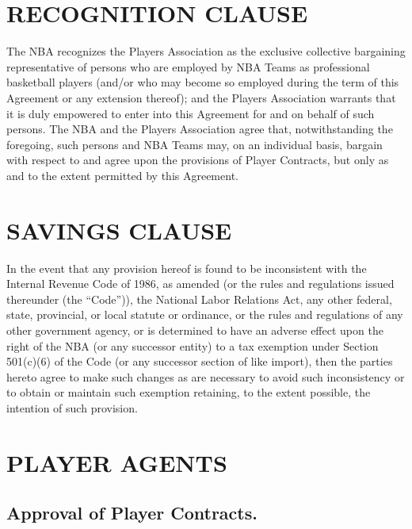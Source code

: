 \documentclass[
]{book}
\begin{document}
\hypertarget{recognition-clause}{%
\chapter{RECOGNITION CLAUSE}\label{recognition-clause}}

The NBA recognizes the Players Association as the exclusive collective bargaining representative of persons who are employed by NBA Teams as professional basketball players (and/or who may become so employed during the term of this Agreement or any extension thereof); and the Players Association warrants that it is duly empowered to enter into this Agreement for and on behalf of such persons. The NBA and the Players Association agree that, notwithstanding the foregoing, such persons and NBA Teams may, on an individual basis, bargain with respect to and agree upon the provisions of Player Contracts, but only as and to the extent permitted by this Agreement.

\hypertarget{savings-clause}{%
\chapter{SAVINGS CLAUSE}\label{savings-clause}}

In the event that any provision hereof is found to be inconsistent with the Internal Revenue Code of 1986, as amended (or the rules and regulations issued thereunder (the ``Code'')), the National Labor Relations Act, any other federal, state, provincial, or local statute or ordinance, or the rules and regulations of any other government agency, or is determined to have an adverse effect upon the right of the NBA (or any successor entity) to a tax exemption under Section 501(c)(6) of the Code (or any successor section of like import), then the parties hereto agree to make such changes as are necessary to avoid such inconsistency or to obtain or maintain such exemption retaining, to the extent possible, the intention of such provision.

\hypertarget{player-agents}{%
\chapter{PLAYER AGENTS}\label{player-agents}}

\hypertarget{approval-of-player-contracts.}{%
\section{Approval of Player Contracts.}\label{approval-of-player-contracts.}}
\end{document}
